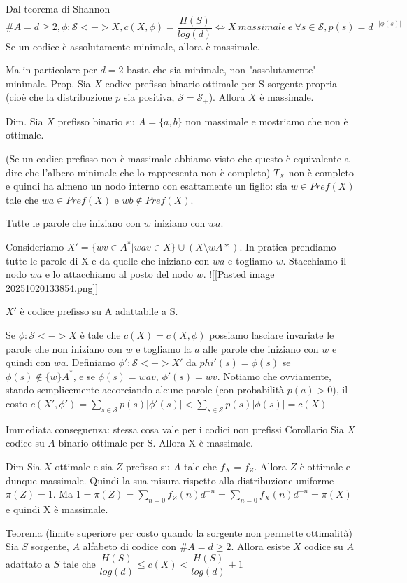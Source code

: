 Dal teorema di Shannon
$\#A=d\ge 2, \phi: \mathcal{S} <-> X, c(X,\phi)=\dfrac{H(S)}{log(d)} \iff X \ massimale \ e \ \forall s\in \mathcal S, p(s)=d^{-|\phi(s)|}$
Se un codice è assolutamente minimale, allora è massimale.

Ma in particolare per $d=2$  basta che sia minimale, non "assolutamente" minimale.
Prop.
Sia $X$ codice prefisso binario ottimale per S sorgente propria (cioè che la distribuzione $p$ sia positiva, $\mathcal{S}=\mathcal{S}_+$). Allora $X$ è massimale.

Dim.
Sia $X$ prefisso binario su $A=\{a,b\}$ non massimale e mostriamo che non è ottimale.

(Se un codice prefisso non è massimale abbiamo visto che questo è equivalente a dire che l'albero minimale che lo rappresenta non è completo)
$T_X$ non è completo e quindi ha almeno un nodo interno con esattamente un figlio: sia $w\in Pref(X)$ tale che $wa \in Pref(X)$ e $wb\notin Pref(X)$.

Tutte le parole che iniziano con $w$ iniziano con $wa$.

Consideriamo $X'=\{wv\in A^*|wav\in X\} \cup (X \setminus {w}A*)$. In pratica prendiamo tutte le parole di X e da quelle che iniziano con $wa$ e togliamo $w$. Stacchiamo il nodo $wa$ e lo attacchiamo al posto del nodo $w$.
![[Pasted image 20251020133854.png]]

$X'$ è codice prefisso su A adattabile a S.

Se $\phi: \mathcal S <-> X$ è tale che $c(X)=c(X,\phi)$ possiamo lasciare invariate le parole che non iniziano con $w$ e togliamo la $a$ alle parole che iniziano con $w$ e quindi con $wa$.
Definiamo $\phi': \mathcal S <-> X'$ da $phi'(s)=\phi(s)$ se $\phi(s) \notin \{w\}A^*$, e se $\phi(s)=wav$, $\phi'(s)=wv$.
Notiamo che ovviamente, stando semplicemente accorciando alcune parole (con probabilità $p(a)>0$), il costo $c(X',\phi')=\sum_{s\in \mathcal{S}}p(s)|\phi'(s)|\lt \sum_{s\in \mathcal{S}}p(s)|\phi(s)|=c(X)$


Immediata conseguenza: stessa cosa vale per i codici non prefissi
Corollario
Sia $X$ codice su $A$ binario ottimale per S. Allora X è massimale.

Dim
Sia $X$ ottimale e sia $Z$ prefisso su $A$ tale che $f_X=f_Z$. Allora $Z$ è ottimale e dunque massimale.
Quindi la sua misura rispetto alla distribuzione uniforme $\pi(Z)=1$.
Ma $1 = \pi(Z)=\sum_{n=0}f_Z(n)d^{-n}= \sum_{n=0}f_X(n)d^{-n}=\pi(X)$ e quindi X è massimale.


Teorema (limite superiore per costo quando la sorgente non permette ottimalità)
Sia $S$ sorgente, $A$ alfabeto di codice con $\#A=d\ge 2$. Allora esiste $X$ codice su $A$ adattato a $S$ tale che $\dfrac{H(S)}{log(d)}\le c(X) \lt \dfrac{H(S)}{log(d)}+1$

